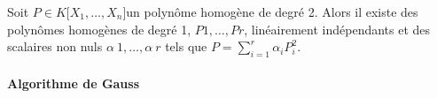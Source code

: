 %
%
\begin{prop}
	Soit $ P \in
K[X_1,\ldots,X_n{]}
$un polynôme homogène de degré 2. Alors il existe des polynômes homogènes
de degré 1,
$P1,\ldots,Pr$,
linéairement indépendants et des scalaires non nuls
$\alpha~1,\ldots,\alpha~r$
tels que $P = \sum_{i=1}^r \alpha_i P_i^2$.
%
\end{prop}

\paragraph{Algorithme de Gauss}



